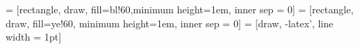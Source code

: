 \documentclass{beamer}
\begin{document}
\pagestyle{empty}






   = [rectangle, draw, fill=bl!60,minimum height=1em, inner sep = 0]
 = [rectangle, draw, fill=ye!60, minimum height=1em, inner sep = 0]
 = [draw, -latex', line width = 1pt]
\end{document}
